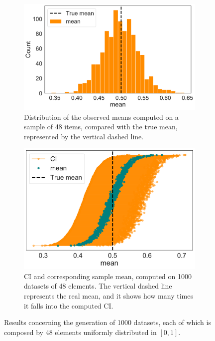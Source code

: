 \documentclass[twoside,onecolumn]{article}
\theoremstyle{definition}
\begin{document}
\begin{figure} \centering
\begin{subfigure}{0.5\textwidth}
         \includegraphics[width=\textwidth]{../figs/mean_distr_unif.pdf}
         \caption{Distribution of the observed means computed on a sample of 48 items, compared with the true mean, represented by the vertical dashed line.}\label{fig:mean_unif}
     \end{subfigure}
     \begin{subfigure}{0.45\textwidth}
         \includegraphics[width=\textwidth]{../figs/unif_mean_CI.pdf}
         \caption{ CI and corresponding sample mean, computed on 1000 datasets of 48 elements. The vertical dashed line represents the real mean, and it shows how many times it falls into the computed CI.}\label{fig:meanci_unif}
     \end{subfigure}
  \caption{Results concerning the generation of 1000 datasets, each of which is composed by 48 elements uniformly distributed in $[0,1]$.  }\label{fig:ci_unif_mean}
\end{figure}
\end{document}
